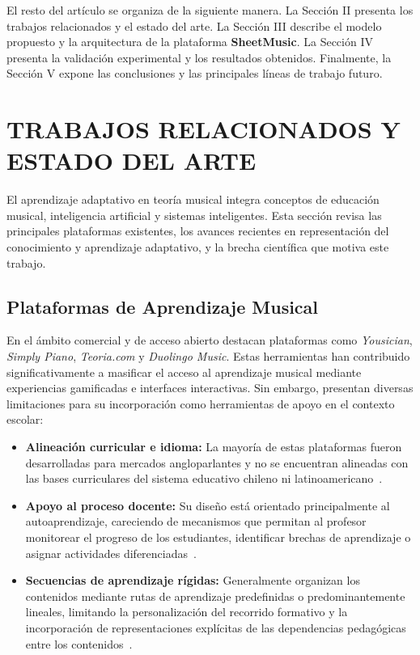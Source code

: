 \documentclass[conference]{IEEEtran}
\begin{document}
El resto del artículo se organiza de la siguiente manera. La Sección II presenta los trabajos relacionados y el estado del arte. La Sección III describe el modelo propuesto y la arquitectura de la plataforma \textbf{SheetMusic}. La Sección IV presenta la validación experimental y los resultados obtenidos. Finalmente, la Sección V expone las conclusiones y las principales líneas de trabajo futuro.

\section{TRABAJOS RELACIONADOS Y ESTADO DEL ARTE}

El aprendizaje adaptativo en teoría musical integra conceptos de educación musical, inteligencia artificial y sistemas inteligentes. Esta sección revisa las principales plataformas existentes, los avances recientes en representación del conocimiento y aprendizaje adaptativo, y la brecha científica que motiva este trabajo.

\subsection{Plataformas de Aprendizaje Musical}

En el ámbito comercial y de acceso abierto destacan plataformas como \textit{Yousician}, \textit{Simply Piano}, \textit{Teoria.com} y \textit{Duolingo Music}. Estas herramientas han contribuido significativamente a masificar el acceso al aprendizaje musical mediante experiencias gamificadas e interfaces interactivas. Sin embargo, presentan diversas limitaciones para su incorporación como herramientas de apoyo en el contexto escolar:

\begin{itemize}

\item \textbf{Alineación curricular e idioma:} La mayoría de estas plataformas fueron desarrolladas para mercados angloparlantes y no se encuentran alineadas con las bases curriculares del sistema educativo chileno ni latinoamericano~\cite{garcia2025,alrowais2025}.

\item \textbf{Apoyo al proceso docente:} Su diseño está orientado principalmente al autoaprendizaje, careciendo de mecanismos que permitan al profesor monitorear el progreso de los estudiantes, identificar brechas de aprendizaje o asignar actividades diferenciadas~\cite{garcia2025,alrowais2025,li2025}.

\item \textbf{Secuencias de aprendizaje rígidas:} Generalmente organizan los contenidos mediante rutas de aprendizaje predefinidas o predominantemente lineales, limitando la personalización del recorrido formativo y la incorporación de representaciones explícitas de las dependencias pedagógicas entre los contenidos~\cite{alrowais2025,li2025}.

\end{itemize}
\end{document}
